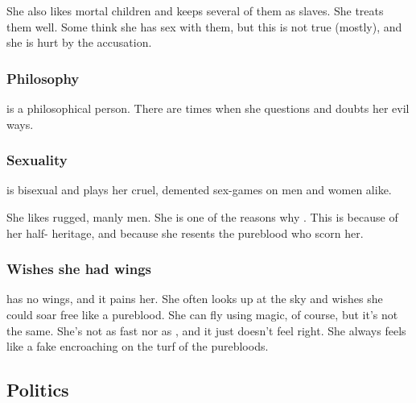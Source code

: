 She also likes mortal children and keeps several of them as slaves. 
She treats them well. 
Some think she has sex with them, but this is not true (mostly), and she is hurt by the accusation. 





\subsubsection{Philosophy}
\Achsah{} is a philosophical person. 
There are times when she questions and doubts her evil ways.







\subsubsection{Sexuality}
\Achsah{} is bisexual and plays her cruel, demented sex-games on men and women alike.

She likes rugged, manly men. 
She is one of the reasons why . 
This is because of her half-\nephil{} heritage, and because she resents the pureblood \resphain{} who scorn her. 






\subsubsection{Wishes she had wings}
\Achsah{} has no wings, and it pains her. 
She often looks up at the sky and wishes she could soar free like a pureblood. 
She can fly using magic, of course, but it's not the same. 
She's not as fast nor as \manoeuvrable, and it just doesn't feel right. 
She always feels like a fake encroaching on the turf of the purebloods. 







\subsection{Politics}





